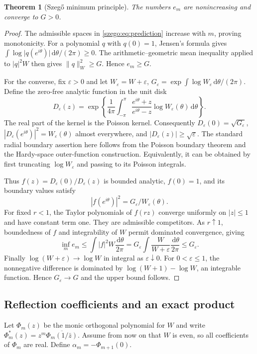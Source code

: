 \documentclass[11pt,a4paper]{article}
\numberwithin{equation}{section}
\newtheorem{theorem}{Theorem}[section]
\theoremstyle{remark}\newtheorem{remark}[theorem]{Remark}
\newcommand{\dd}{\,\mathrm d}
\newcommand{\abs}[1]{\lvert#1\rvert}
\newcommand{\norm}[1]{\lVert#1\rVert}
\begin{document}
\begin{theorem}[Szeg\H{o} minimum principle]\label{szego:thm:minimum}
The numbers $e_m$ are nonincreasing and converge to $G>0$.
\end{theorem}
\begin{proof}
The admissible spaces in \eqref{szego:eq:prediction} increase with $m$, proving
monotonicity. For a polynomial $q$ with $q(0)=1$, Jensen's formula gives
$\int\log\abs{q(e^{i\theta})}\dd\theta/(2\pi)\geq0$.
The arithmetic--geometric mean inequality applied to $|q|^2W$ then gives
$\norm{q}_W^2\geq G$. Hence $e_m\geq G$.

For the converse, fix $\varepsilon>0$ and let $W_\varepsilon=W+\varepsilon$,
$G_\varepsilon=\exp\int\log W_\varepsilon\dd\theta/(2\pi)$.
Define the zero-free analytic function in the unit disk
\[
 D_\varepsilon(z)=\exp\!\left\{\frac1{4\pi}
 \int_{-\pi}^{\pi}\frac{e^{i\theta}+z}{e^{i\theta}-z}
                      \log W_\varepsilon(\theta)\dd\theta\right\}.
\]
The real part of the kernel is the Poisson kernel. Consequently
$D_\varepsilon(0)=\sqrt{G_\varepsilon}$,
$|D_\varepsilon(e^{i\theta})|^2=W_\varepsilon(\theta)$ almost everywhere,
and $|D_\varepsilon(z)|\geq\sqrt\varepsilon$.
The standard radial boundary assertion here follows from the Poisson
boundary theorem and the Hardy-space outer-function construction.
Equivalently, it can be obtained by first truncating $\log W_\varepsilon$
and passing to its Poisson integrals.

Thus
$f(z)=D_\varepsilon(0)/D_\varepsilon(z)$ is bounded analytic, $f(0)=1$,
and its boundary values satisfy
\[
 |f(e^{i\theta})|^2=G_\varepsilon/W_\varepsilon(\theta).
\]
For fixed $r<1$, the Taylor polynomials of $f(rz)$ converge uniformly on
$|z|\leq1$ and have constant term one. They are admissible competitors.
As $r\uparrow1$, boundedness of $f$ and integrability of $W$ permit dominated
convergence, giving
\[
 \inf_m e_m\leq\int|f|^2W\frac{\dd\theta}{2\pi}
 =G_\varepsilon\int\frac W{W+\varepsilon}\frac{\dd\theta}{2\pi}
 \leq G_\varepsilon.
\]
Finally $\log(W+\varepsilon)\to\log W$ in integral as $\varepsilon\downarrow0$.
For $0<\varepsilon\leq1$, the nonnegative difference is dominated by
$\log(W+1)-\log W$, an integrable function. Hence
$G_\varepsilon\to G$ and the upper bound follows.
\end{proof}

\subsection{Reflection coefficients and an exact product}
Let $\Phi_m(z)$ be the monic orthogonal polynomial for $W$ and write
$\Phi_m^*(z)=z^m\overline{\Phi_m(1/\bar z)}$.
Assume from now on that $W$ is even, so all coefficients of $\Phi_m$ are real.
Define $\alpha_m=-\Phi_{m+1}(0)$.
\end{document}
